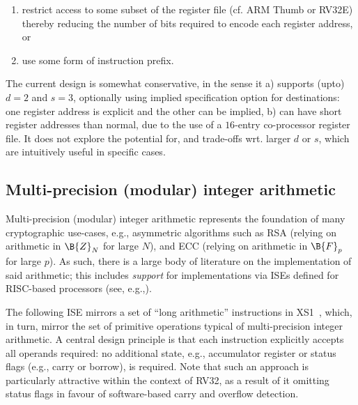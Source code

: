 \begin{itemize}
      \begin{enumerate}
      \item restrict access to some subset of the register file 
            (cf. ARM Thumb or RV32E) 
            thereby reducing the number of bits required to encode each  
            register address,
            or
      \item use some form of instruction prefix.
      \end{enumerate}
      
      \noindent
      The current design is somewhat conservative, in the sense it 
      a) supports (upto) $d = 2$ and $s = 3$, 
         optionally using implied specification option for destinations: 
         one register address is explicit and the other can be implied,
      b) can have short register addresses than normal, due to the use
         of a $16$-entry co-processor register file.
      It does not explore the potential for, and trade-offs wrt. larger 
      $d$ or $s$, which are intuitively useful in specific cases.

\end{itemize}


\subsection{Multi-precision (modular) integer arithmetic}

Multi-precision (modular) integer arithmetic represents the foundation
of many cryptographic use-cases, e.g., asymmetric algorithms such as
RSA (relying on arithmetic in $\B{Z}_N$ for large $N$),
and
ECC (relying on arithmetic in $\B{F}_p$ for large $p$).
As such, there is a large body of literature on the implementation of
said arithmetic; this includes {\em support} for implementations via
ISEs defined for RISC-based processors
(see, e.g.,\cite{SCARV:GroKam:03,SCARV:GroKam:04}).

The following ISE mirrors a set of ``long arithmetic'' instructions in
XS1~\cite[Section 18]{SCARV:XS1:09}, which, in turn, mirror the set of
primitive operations typical of multi-precision integer arithmetic.  
A central design principle is that each instruction explicitly accepts 
all operands required: no additional state, e.g., accumulator register
or status flags (e.g., carry or borrow), is required.  Note that such
an approach is particularly attractive within the context of RV32, as
a result of it omitting status flags in favour of software-based carry
and overflow detection.

